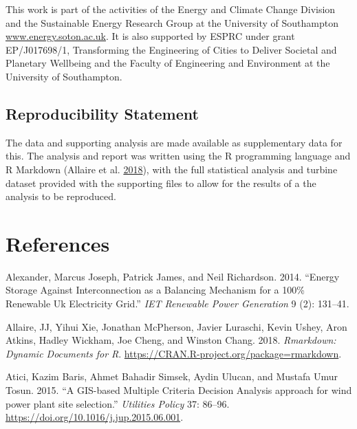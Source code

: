 \documentclass[a4paper,]{article}
\theoremstyle{definition}
\theoremstyle{definition}
\theoremstyle{definition}
\theoremstyle{remark}
\begin{document}
This work is part of the activities of the Energy and Climate Change
Division and the Sustainable Energy Research Group at the University of
Southampton \url{www.energy.soton.ac.uk}. It is also supported by ESPRC
under grant EP/J017698/1, Transforming the Engineering of Cities to
Deliver Societal and Planetary Wellbeing and the Faculty of Engineering
and Environment at the University of Southampton.

\hypertarget{reproducibility-statement}{%
\subsection*{Reproducibility
Statement}\label{reproducibility-statement}}

The data and supporting analysis are made available as supplementary
data for this. The analysis and report was written using the R
programming language and R Markdown (Allaire et al.
\protect\hyperlink{ref-R-rmarkdown}{2018}), with the full statistical
analysis and turbine dataset provided with the supporting files to allow
for the results of a the analysis to be reproduced.

\hypertarget{references}{%
\section*{References}\label{references}}

\let\oldhypertarget\hypertarget

\renewcommand{\hypertarget}[2]{%
    \leavevmode%
    \oldhypertarget{#1}{#2}%
}

\hypertarget{refs}{}
\leavevmode\hypertarget{ref-alexander2014energy}{}%
Alexander, Marcus Joseph, Patrick James, and Neil Richardson. 2014.
``Energy Storage Against Interconnection as a Balancing Mechanism for a
100\% Renewable Uk Electricity Grid.'' \emph{IET Renewable Power
Generation} 9 (2): 131--41.

\leavevmode\hypertarget{ref-R-rmarkdown}{}%
Allaire, JJ, Yihui Xie, Jonathan McPherson, Javier Luraschi, Kevin
Ushey, Aron Atkins, Hadley Wickham, Joe Cheng, and Winston Chang. 2018.
\emph{Rmarkdown: Dynamic Documents for R}.
\url{https://CRAN.R-project.org/package=rmarkdown}.

\leavevmode\hypertarget{ref-Atici2015}{}%
Atici, Kazim Baris, Ahmet Bahadir Simsek, Aydin Ulucan, and Mustafa Umur
Tosun. 2015. ``A GIS-based Multiple Criteria Decision Analysis approach
for wind power plant site selection.'' \emph{Utilities Policy} 37:
86--96. \url{https://doi.org/10.1016/j.jup.2015.06.001}.
\end{document}
